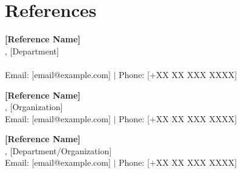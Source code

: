 \documentclass[10pt,letterpaper]{article}
\begin{document}
\section*{References}
\textbf{[Reference Name]} \\
[Position], [Department] \\
[Organization] \\
Email: [email@example.com] $\vert$ Phone: [+XX XX XXX XXXX]

\vspace{0.2cm}

\textbf{[Reference Name]} \\
[Position], [Organization] \\
Email: [email@example.com] $\vert$ Phone: [+XX XX XXX XXXX]

\vspace{0.2cm}

\textbf{[Reference Name]} \\
[Position], [Department/Organization] \\
Email: [email@example.com] $\vert$ Phone: [+XX XX XXX XXXX]
\end{document}
